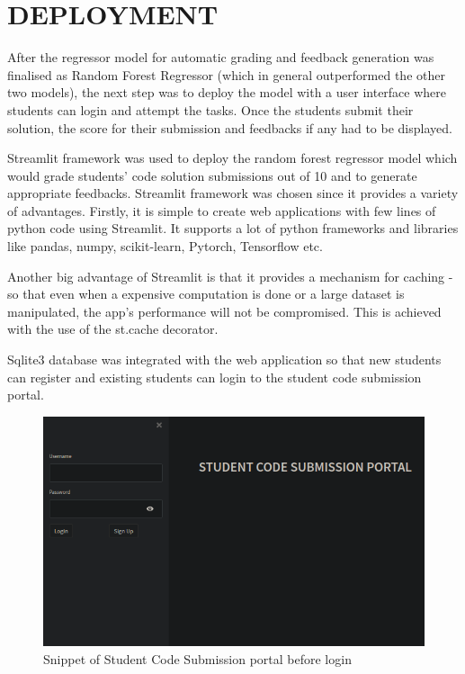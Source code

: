 
\chapter{DEPLOYMENT}

After the regressor model for automatic grading and feedback generation was finalised as Random Forest Regressor (which in general outperformed the other two models), the next step was to deploy the model with a user interface where students can login and attempt the tasks. Once the students submit their solution, the score for their submission and feedbacks if any had to be displayed.

Streamlit framework was used to deploy the random forest regressor model which would grade students' code solution submissions out of 10 and to generate appropriate feedbacks. Streamlit framework was chosen since it provides a variety of advantages. Firstly, it is simple to create web applications with few lines of python code using Streamlit. It supports a lot of python frameworks and libraries like pandas, numpy, scikit-learn, Pytorch, Tensorflow etc.

Another big advantage of Streamlit is that it provides a mechanism for caching - so that even when a expensive computation is done or a large dataset is manipulated, the app's performance will not be compromised.
This is achieved with the use of the st.cache decorator.

Sqlite3 database was integrated with the web application so that new students can register and existing students can login to the student code submission portal. 



\newpage
\begin{figure}[h]
\centering
\includegraphics[scale=0.6]{./figures/dep1.png}
\caption{Snippet of Student Code Submission portal before login}
\label{fig1}
\end{figure}

